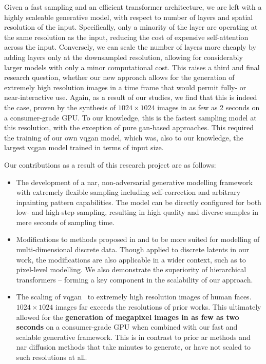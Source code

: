 Given a fast sampling and an efficient transformer architecture, we are left
with a highly scaleable generative model, with respect to number of layers and
spatial resolution of the input. Specifically, only a minority of the layer are
operating at the same resolution as the input, reducing the cost of expensive
self-attention across the input. Conversely, we can scale the number of layers
more cheaply by adding layers only at the downsampled resolution, allowing for
considerably larger models with only a minor computational cost. This
raises a third and final research question, whether our new approach allows for
the generation of extremely high resolution images in a time frame that would
permit fully- or near-interactive use. Again, as a result of our studies, we
find that this is indeed the case, proven by the synthesis of $1024 \times 1024$
images in as few as 2 seconds on a consumer-grade GPU. To our knowledge, this is
the fastest sampling model at this resolution, with the exception of pure
\gls{gan}-based approaches. This required the training of our own \gls{vqgan}
model, which was, also to our knowledge, the largest \gls{vqgan} model trained
in terms of input size.

Our contributions as a result of this research project are as follows:
\begin{itemize}
    \item
        The development of a \acrlong{nar}, non-adversarial generative modelling
        framework with extremely flexible sampling including self-correction and
        arbitrary inpainting pattern capabilities. The model can be directly
        configured for both low- and high-step sampling, resulting in high
        quality and diverse samples in mere seconds of sampling time.

    \item
        Modifications to methods proposed in \citet{savinov2022stepunrolled} and
        \citet{nawrot2021hierarchical} to be more suited for modelling of
        multi-dimensional discrete data. Though applied to discrete latents in
        our work, the modifications are also applicable in a wider context,
        such as to pixel-level modelling. We also demonstrate the superiority of
        hierarchical transformers -- forming a key component in the scalability
        of our approach. 

    \item
        The scaling of \gls{vqgan}~\cite{esser2021taming} to extremely high
        resolution images of human faces. $1024 \times 1024$ images far exceeds
        the resolutions of prior works. This ultimately allowed for the
        \textbf{generation of megapixel images in as few as two seconds} on a
        consumer-grade GPU when combined with our fast and scalable generative
        framework. This is in contrast to prior \gls{ar} methods and \gls{nar}
        diffusion methods that take minutes to generate, or have not scaled to
        such resolutions at all.

\end{itemize}


